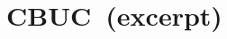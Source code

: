 \documentclass[11pt,a4paper]{article}
\newcommand{\CBUC}{\textsc{CBUC}}
\begin{document}
\section{\CBUC\ (excerpt)}






\end{document}
